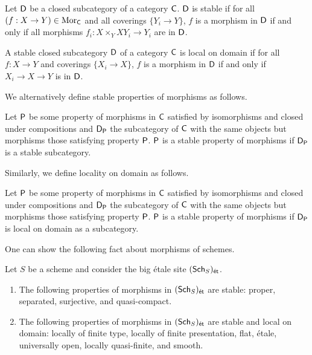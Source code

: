 \begin{definition}\label{def: stable subcategory}
    Let $\mathsf{D}$ be a closed subcategory of a category $\mathsf{C}$. $\mathsf{D}$ is stable if for all $(f:X\to Y)\in\mathrm{Mor}_{\mathsf{C}}$ and all coverings $\{Y_{i}\to Y\}$, $f$ is a morphism in $\mathsf{D}$ if and only if all morphisms $f_{i}:X\times_{Y}XY_{i}\to Y_{i}$ are in $\mathsf{D}$. 
\end{definition}
\begin{definition}\label{def: local on domain}
    A stable closed subcategory $\mathsf{D}$ of a category $\mathsf{C}$ is local on domain if for all $f:X\to Y$ and coverings $\{X_{i}\to X\}$, $f$ is a morphism in $\mathsf{D}$ if and only if $X_{i}\to X\to Y$ is in $\mathsf{D}$. 
\end{definition}
We alternatively define stable properties of morphisms  as follows. 
\begin{definition}\label{def: stable property of morphisms 2}
    Let $\mathsf{P}$ be some property of morphisms in $\mathsf{C}$ satisfied by isomorphisms and closed under compositions and $\mathsf{D}_{\mathsf{P}}$ the subcategory of $\mathsf{C}$ with the same objects but morphisms those satisfying property $\mathsf{P}$. $\mathsf{P}$ is a stable property of morphisms if $\mathsf{D}_{\mathsf{P}}$ is a stable subcategory. 
\end{definition}
Similarly, we define locality on domain as follows. 
\begin{definition}\label{def: morphisms local on domain}
    Let $\mathsf{P}$ be some property of morphisms in $\mathsf{C}$ satisfied by isomorphisms and closed under compositions and $\mathsf{D}_{\mathsf{P}}$ the subcategory of $\mathsf{C}$ with the same objects but morphisms those satisfying property $\mathsf{P}$. $\mathsf{P}$ is a stable property of morphisms if $\mathsf{D}_{\mathsf{P}}$ is local on domain as a subcategory. 
\end{definition}
One can show the following fact about morphisms of schemes. \newpage
\begin{proposition}\label{prop: stable properties of morphisms of schemes}
    Let $S$ be a scheme and consider the big \'{e}tale site $(\mathsf{Sch}_{S})_{\mathsf{\acute{e}t}}$. 
    \begin{enumerate}[label=(\alph*)]
        \item The following properties of morphisms in $(\mathsf{Sch}_{S})_{\mathsf{\acute{e}t}}$ are stable: proper, separated, surjective, and quasi-compact. 
        \item The following properties of morphisms in $(\mathsf{Sch}_{S})_{\mathsf{\acute{e}t}}$ are stable and local on domain: locally of finite type, locally of finite presentation, flat, \'{e}tale, universally open, locally quasi-finite, and smooth. 
    \end{enumerate}
\end{proposition}

